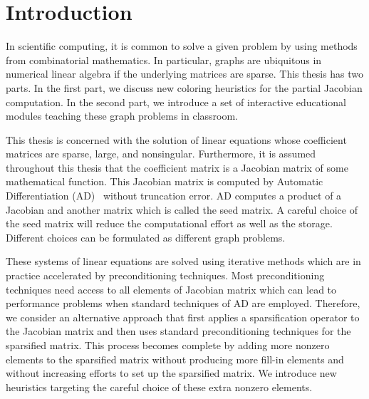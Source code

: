 \documentclass[12pt, twoside,a4paper,toc=bibliography]{scrbook}
\begin{document}
\tableofcontents
\chapter{Introduction}
In scientific computing, it is common to solve a given problem by using methods from combinatorial mathematics.
In particular, graphs are ubiquitous in numerical linear algebra if the underlying matrices are sparse.
This thesis has two parts.
In the first part, we discuss new coloring heuristics for the partial Jacobian computation.
In the second part, we introduce a set of interactive educational modules teaching these graph problems in classroom.

This thesis is concerned with
the solution of linear equations whose coefficient matrices are sparse, large, and nonsingular.
Furthermore, it is assumed throughout this thesis that the coefficient matrix is a
Jacobian matrix of some mathematical function.
This Jacobian matrix is computed by Automatic Differentiation (AD)~\cite{Griewank2008EDP,Rall1981ADT} without truncation error.
AD computes a product of a Jacobian and another matrix which is called the seed matrix.
A careful choice of the seed matrix will reduce the computational effort as well as
the storage. Different choices can be formulated as different graph problems.

These systems of linear equations are solved using iterative methods which are in practice accelerated by preconditioning techniques.
Most preconditioning techniques need access to all elements of Jacobian matrix which
can lead to performance problems when standard techniques of AD are employed.
Therefore, we consider an alternative approach that first applies a sparsification operator to the Jacobian matrix and then
uses standard preconditioning techniques for the sparsified matrix.
This process becomes complete by adding more nonzero elements to the sparsified matrix
without producing more fill-in elements and without increasing efforts to set up the sparsified matrix.
We introduce new heuristics targeting the careful choice of these extra nonzero elements.
\end{document}
